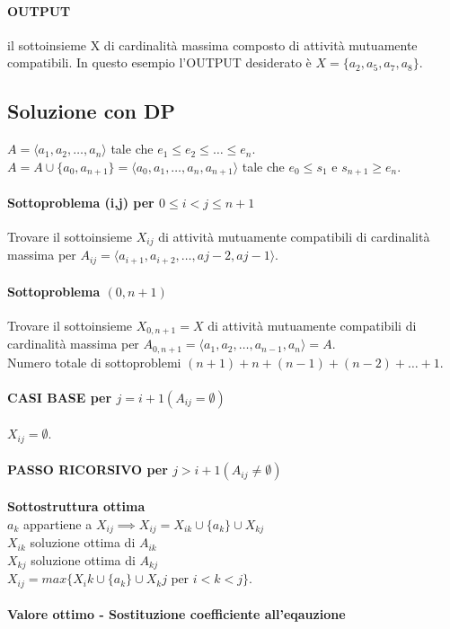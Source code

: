 \paragraph*{OUTPUT} il sottoinsieme X di cardinalità massima composto di attività mutuamente compatibili.
In questo esempio l'OUTPUT desiderato è $X = \{a_2, a_5, a_7, a_8\}$.
\subsection{Soluzione con DP}
$A = \langle a_1, a_2,\dots,a_n\rangle$ tale che $e_1 \leq e_2 \leq \dots \leq e_n$.\\
$A = A \cup \{a_0, a_{n+1}\} = \langle a_0, a_1, \dots, a_n, a_{n+1}\rangle$ tale che $e_0 \leq s_1$
e $s_{n+1} \geq e_n$.
\paragraph*{Sottoproblema (i,j) per $0 \leq i < j \leq n+1$}
Trovare il sottoinsieme $X_{ij}$ di attività mutuamente compatibili di cardinalità massima per
$A_{ij} = \langle a_{i+1}, a_{i+2},\dots,a{j-2}, a{j-1} \rangle$.
\paragraph*{Sottoproblema $(0, n+1)$}
Trovare il sottoinsieme $X_{0,n+1} = X$ di attività mutuamente compatibili di cardinalità
massima per $A_{0,n+1} = \langle a_1, a_2, \dots, a_{n-1}, a_n \rangle = A$.\\
Numero totale di sottoproblemi \ra $(n+1)+n+(n-1)+(n-2)+\dots+1$.
\paragraph*{CASI BASE per $j=i+1 (A_{ij}=\emptyset)$}
$X_{ij} = \emptyset$.
\paragraph*{PASSO RICORSIVO per $j > i +1 (A_{ij} \neq \emptyset)$}
\textbf{Sottostruttura ottima}\\
$a_k$ appartiene a $X_{ij} \implies X_{ij} = X_{ik} \cup \{a_k\} \cup X_{kj}$\\
$X_{ik}$ soluzione ottima di $A_{ik}$\\
$X_{kj}$ soluzione ottima di $A_{kj}$\\
$X_{ij} = max\{X_ik \cup \{a_k\} \cup X_kj \text{ per } i < k < j\}$.
\paragraph*{Valore ottimo - Sostituzione coefficiente all'eqauzione}
